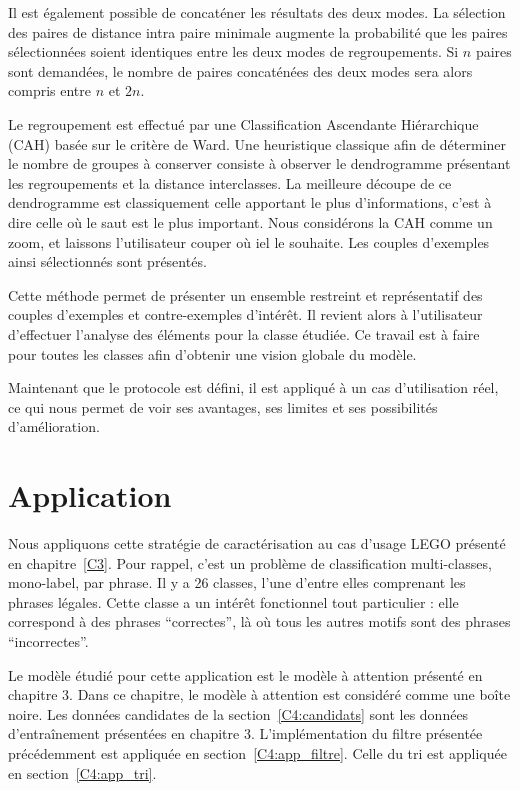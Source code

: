 Il est également possible de concaténer les résultats des deux modes. La sélection des paires de distance intra paire minimale augmente la probabilité que les paires sélectionnées soient identiques entre les deux modes de regroupements. Si $n$ paires sont demandées, le nombre de paires concaténées des deux modes sera alors compris entre $n$ et $2n$.

Le regroupement est effectué par une Classification Ascendante Hiérarchique (CAH) basée sur le critère de Ward.
Une heuristique classique afin de déterminer le nombre de groupes à conserver consiste à observer le dendrogramme présentant les regroupements et la distance interclasses. La meilleure découpe de ce dendrogramme est classiquement celle apportant le plus d'informations, c'est à dire celle où le saut est le plus important. Nous considérons la CAH comme un zoom, et laissons l'utilisateur couper où iel le souhaite. Les couples d'exemples ainsi sélectionnés sont présentés.

Cette méthode permet de présenter un ensemble restreint et représentatif des couples d'exemples et contre-exemples d'intérêt. Il revient alors à l'utilisateur d'effectuer l'analyse des éléments pour la classe étudiée. Ce travail est à faire pour toutes les classes afin d'obtenir une vision globale du modèle.

Maintenant que le protocole est défini, il est appliqué à un cas d'utilisation réel, ce qui nous permet de voir ses avantages, ses limites et ses possibilités d'amélioration.

\section{Application} \label{C4:application}

Nous appliquons cette stratégie de caractérisation au cas d'usage LEGO présenté en chapitre~\ref{C3}. Pour rappel, c'est un problème de classification multi-classes, mono-label, par phrase. Il y a 26 classes, l'une d'entre elles comprenant les phrases légales. Cette classe a un intérêt fonctionnel tout particulier : elle correspond à des phrases ``correctes'', là où tous les autres motifs sont des phrases ``incorrectes''.

Le modèle étudié pour cette application est le modèle à attention présenté en chapitre 3. Dans ce chapitre, le modèle à attention est considéré comme une boîte noire. Les données candidates de la section~\ref{C4:candidats} sont les données d'entraînement présentées en chapitre 3. L'implémentation du filtre présentée précédemment est appliquée en section~\ref{C4:app_filtre}. Celle du tri est appliquée en section~\ref{C4:app_tri}.

